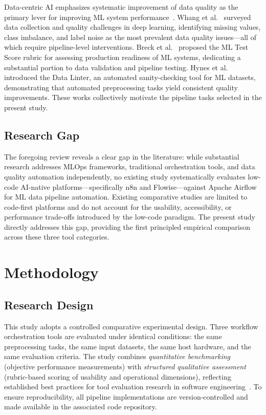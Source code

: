 \documentclass[journal]{IEEEtran}
\begin{document}
Data-centric AI emphasizes systematic improvement of data quality as
the primary lever for improving ML system performance~\cite{whang2023data}.
Whang et al.~\cite{whang2023data} surveyed data collection and quality
challenges in deep learning, identifying missing values, class imbalance,
and label noise as the most prevalent data quality issues---all of which
require pipeline-level interventions. Breck et al.~\cite{breck2017ml}
proposed the ML Test Score rubric for assessing production readiness of
ML systems, dedicating a substantial portion to data validation and
pipeline testing. Hynes et al.~\cite{hynes2017data} introduced the Data
Linter, an automated sanity-checking tool for ML datasets, demonstrating
that automated preprocessing tasks yield consistent quality improvements.
These works collectively motivate the pipeline tasks selected in the
present study.

\subsection{Research Gap}

The foregoing review reveals a clear gap in the literature: while
substantial research addresses MLOps frameworks, traditional orchestration
tools, and data quality automation independently, no existing study
systematically evaluates low-code AI-native platforms---specifically n8n
and Flowise---against Apache Airflow for ML data pipeline automation.
Existing comparative studies are limited to code-first platforms and do
not account for the usability, accessibility, or performance trade-offs
introduced by the low-code paradigm. The present study directly addresses
this gap, providing the first principled empirical comparison across
these three tool categories.


\section{Methodology}
\label{sec:methodology}

\subsection{Research Design}

This study adopts a controlled comparative experimental design. Three
workflow orchestration tools are evaluated under identical conditions:
the same preprocessing tasks, the same input datasets, the same host
hardware, and the same evaluation criteria. The study combines
\textit{quantitative benchmarking} (objective performance measurements)
with \textit{structured qualitative assessment} (rubric-based scoring of
usability and operational dimensions), reflecting established best
practices for tool evaluation research in software
engineering~\cite{amershi2019software}.
To ensure reproducibility, all pipeline implementations are version-controlled
and made available in the associated code repository.
\end{document}
